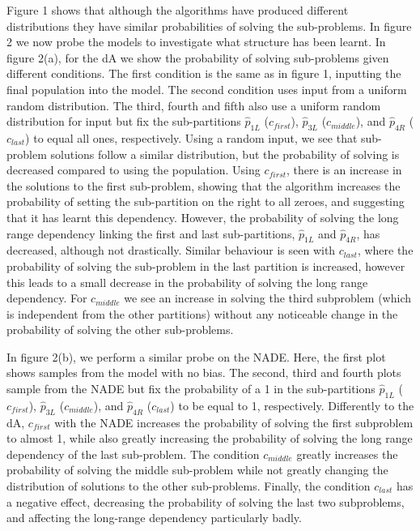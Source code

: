 \documentclass[twoside]{article}
\begin{document}
Figure 1 shows that although the algorithms have produced different distributions they have similar probabilities of solving the sub-problems. In figure 2 we now probe the models to investigate what structure has been learnt. In figure 2(a), for the dA we show the probability of solving sub-problems given different conditions. The first condition is the same as in figure 1, inputting the final population into the model. The second condition uses input from a uniform random distribution. The third, fourth and fifth also use a uniform random distribution for input but fix the sub-partitions \(\hat{p}_{1L}\) (\(c_{first}\)), \(\hat{p}_{3L}\) (\(c_{middle}\)), and \(\hat{p}_{4R}\) (\(c_{last}\)) to equal all ones, respectively. Using a random input, we see that sub-problem solutions follow a similar distribution, but the probability of solving is decreased compared to using the population. Using \(c_{first}\), there is an increase in the solutions to the first sub-problem, showing that the algorithm increases the probability of setting the sub-partition on the right to all zeroes, and suggesting that it has learnt this dependency. However, the probability of solving the long range dependency linking the first and last sub-partitions, \(\hat{p}_{1L}\) and \(\hat{p}_{4R}\), has decreased, although not drastically. Similar behaviour is seen with \(c_{last}\), where the probability of solving the sub-problem in the last partition is increased, however this leads to a small decrease in the probability of solving the long range dependency. For \(c_{middle}\) we see an increase in solving the third subproblem (which is independent from the other partitions) without any noticeable change in the probability of solving the other sub-problems.

In figure 2(b), we perform a similar probe on the NADE. Here, the first plot shows samples from the model with no bias. The second, third and fourth plots sample from the NADE but fix the probability of a 1 in the sub-partitions \(\hat{p}_{1L}\) (\(c_{first}\)), \(\hat{p}_{3L}\) (\(c_{middle}\)), and \(\hat{p}_{4R}\) (\(c_{last}\)) to be equal to 1, respectively. Differently to the dA, \(c_{first}\) with the NADE increases the probability of solving the first subproblem to almost 1, while also greatly increasing the probability of solving the long range dependency of the last sub-problem. The condition \(c_{middle}\) greatly increases the probability of solving the middle sub-problem while not greatly changing the distribution of solutions to the other sub-problems. Finally, the condition \(c_{last}\) has a negative effect, decreasing the probability of solving the last two subproblems, and affecting the long-range dependency particularly badly.
\end{document}
